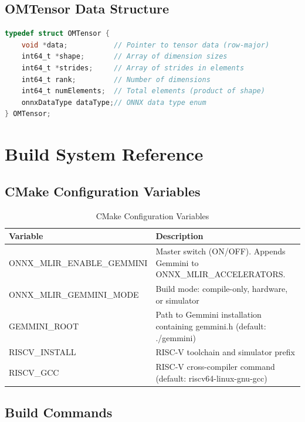 \documentclass[12pt,a4paper]{article}
\begin{document}
\subsection{OMTensor Data Structure}

\begin{lstlisting}[caption=OMTensor Structure, language=C]
typedef struct OMTensor {
    void *data;           // Pointer to tensor data (row-major)
    int64_t *shape;       // Array of dimension sizes
    int64_t *strides;     // Array of strides in elements
    int64_t rank;         // Number of dimensions
    int64_t numElements;  // Total elements (product of shape)
    onnxDataType dataType;// ONNX data type enum
} OMTensor;
\end{lstlisting}

\section{Build System Reference}

\subsection{CMake Configuration Variables}

\begin{table}[H]
\centering
\begin{tabular}{|p{}|p{}|}
\hline
\textbf{Variable} & \textbf{Description} \\
\hline
ONNX\_MLIR\_ENABLE\_GEMMINI & Master switch (ON/OFF). Appends Gemmini to ONNX\_MLIR\_ACCELERATORS. \\
\hline
ONNX\_MLIR\_GEMMINI\_MODE & Build mode: compile-only, hardware, or simulator \\
\hline
GEMMINI\_ROOT & Path to Gemmini installation containing gemmini.h (default: ./gemmini) \\
\hline
RISCV\_INSTALL & RISC-V toolchain and simulator prefix \\
\hline
RISCV\_GCC & RISC-V cross-compiler command (default: riscv64-linux-gnu-gcc) \\
\hline
\end{tabular}
\caption{CMake Configuration Variables}
\end{table}

\subsection{Build Commands}
\end{document}
